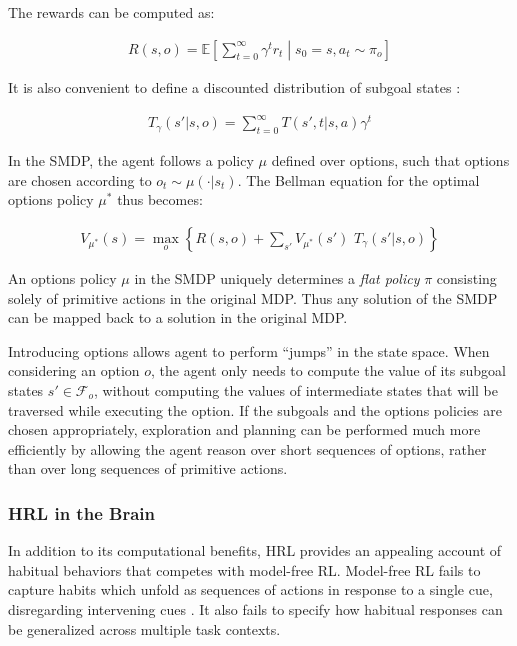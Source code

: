 \documentclass[11pt]{article}
\begin{document}
The rewards can be computed as:

\begin{align*}
R(s,o) = \mathbb{E} \left[ \sum_{t=0}^\infty \gamma^t r_t \middle| s_0 = s, a_t \sim \pi_o \right]
\end{align*}

It is also convenient to define a discounted distribution of subgoal states \cite{Sutton1999}:

\begin{align*}
T_\gamma(s'|s,o) = \sum_{t=0}^\infty T(s',t|s,a) \gamma^t
\end{align*}

In the SMDP, the agent follows a policy $\mu$ defined over options, such that options are chosen according to $o_t \sim \mu(\cdot|s_t)$. The Bellman equation for the optimal options policy $\mu^*$ thus becomes:

\begin{align*}
V_{\mu^*}(s) = \max_o  \left\{ R(s,o) + \sum_{s'} V_{\mu^*}(s') \,\, T_\gamma(s'|s,o) \right\} 
\end{align*}

An options policy $\mu$ in the SMDP uniquely determines a \textit{flat policy} $\pi$ consisting solely of primitive actions in the original MDP. Thus any solution of the SMDP can be mapped back to a solution in the original MDP.

Introducing options allows agent to perform ``jumps'' in the state space. When considering an option $o$, the agent only needs to compute the value of its subgoal states $s' \in \mathcal{F}_o$, without computing the values of intermediate states that will be traversed while executing the option. If the subgoals and the options policies are chosen appropriately, exploration and planning can be performed much more efficiently by allowing the agent reason over short sequences of options, rather than over long sequences of primitive actions.

\subsubsection{HRL in the Brain}

In addition to its computational benefits, HRL provides an appealing account of habitual behaviors \cite{Botvinick2008} that competes with model-free RL. Model-free RL fails to capture habits which unfold as sequences of actions in response to a single cue, disregarding intervening cues \cite{Dezfouli2013}. It also fails to specify how habitual responses can be generalized across multiple task contexts.
\end{document}
